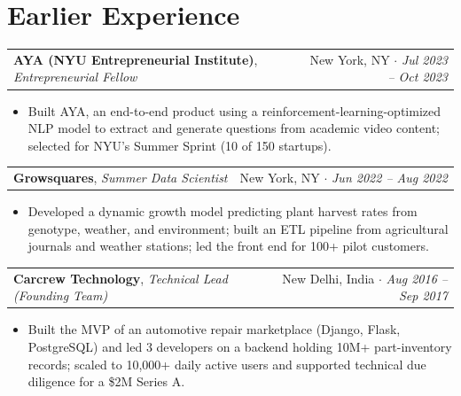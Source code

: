 \documentclass[letterpaper,11pt]{article}
\makeatletter
\newenvironment{bullets}{\begin{itemize}[leftmargin=12pt,itemsep=2pt,parsep=0pt,topsep=1.5pt]}{\end{itemize}\vspace{3pt}}
\newcommand{\centry}[4]{%
  \begin{tabularx}{\textwidth}{@{}X r@{}}
    \textbf{#1}, \textit{#2} & #3 $\cdot$ \textit{#4} \\
  \end{tabularx}\vspace{-3pt}}
\makeatother
\begin{document}
\newpage
\linespread{1}\fontsize{11.2}{13}\selectfont
\section{Earlier Experience}
\centry{AYA (NYU Entrepreneurial Institute)}{Entrepreneurial Fellow}{New York, NY}{Jul 2023 -- Oct 2023}
\begin{bullets}
  \item Built AYA, an end-to-end product using a reinforcement-learning-optimized NLP model to extract and generate questions from
        academic video content; selected for NYU's Summer Sprint (10 of 150 startups).
\end{bullets}

\centry{Growsquares}{Summer Data Scientist}{New York, NY}{Jun 2022 -- Aug 2022}
\begin{bullets}
  \item Developed a dynamic growth model predicting plant harvest rates from genotype, weather, and environment;
        built an ETL pipeline from agricultural journals and weather stations; led the front end for 100+ pilot customers.
\end{bullets}

\centry{Carcrew Technology}{Technical Lead (Founding Team)}{New Delhi, India}{Aug 2016 -- Sep 2017}
\begin{bullets}
  \item Built the MVP of an automotive repair marketplace (Django, Flask, PostgreSQL) and led 3 developers on a backend holding 10M+
        part-inventory records; scaled to 10,000+ daily active users and supported technical due diligence for a \$2M Series A.
\end{bullets}


\end{document}
